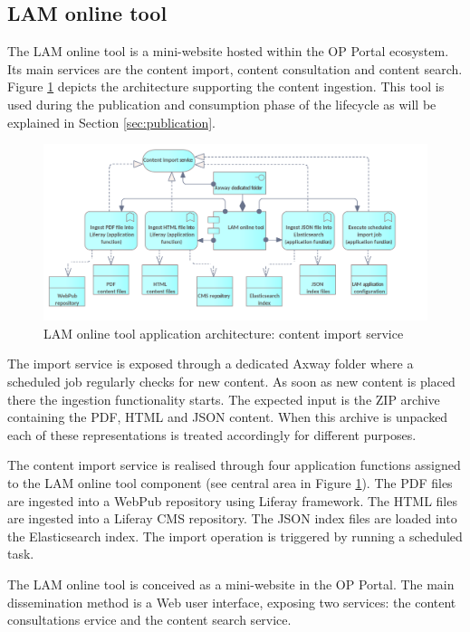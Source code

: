 	\subsection{LAM online tool}
	
	The LAM online tool is a mini-website hosted within the OP Portal ecosystem. Its main services are the content import, content consultation and content search. Figure \ref{fig:app-online-tool-ingestion} depicts the architecture supporting the content ingestion. 
	This tool is used during the publication and consumption phase of the lifecycle as will be explained in Section \ref{sec:publication}.
		
    \begin{figure}[!h]
		\centering
		\includegraphics[width=.98\textwidth]{images/application/Online tool - import.png}
		\caption{LAM online tool application architecture: content import service}
		\label{fig:app-online-tool-ingestion}
	\end{figure}	

	The import service is exposed through a dedicated Axway folder where a scheduled job regularly checks for new content. As soon as new content is placed there the ingestion functionality starts. The expected input is the ZIP archive containing the PDF, HTML and JSON content. When this archive is unpacked each of these representations is treated accordingly for different purposes.
	
	The content import service is realised through four application functions assigned to the LAM online tool component (see central area in Figure \ref{fig:app-online-tool-ingestion}). The PDF files are ingested into a WebPub repository using Liferay framework. The HTML files are ingested into a Liferay CMS repository. The JSON index files are loaded into the Elasticsearch index. The import operation is triggered by running a scheduled task. 
	
	
	The LAM online tool is conceived as a mini-website in the OP Portal. The main dissemination method is a Web user interface, exposing two services: the content consultations ervice and the content search service. 
	
